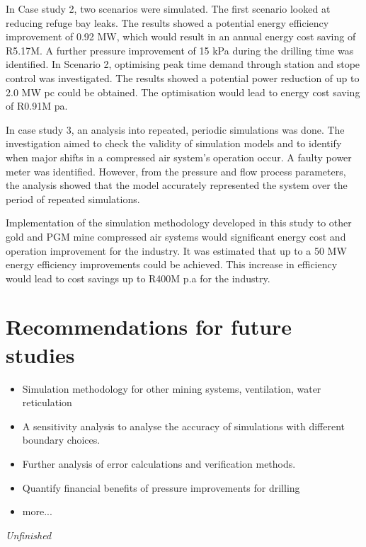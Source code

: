 	 \par
	 In Case study 2, two scenarios were simulated. The first scenario looked at reducing refuge bay leaks. The results showed a potential energy efficiency improvement of 0.92 MW, which would result in an annual energy cost saving of R5.17M. A further pressure improvement of 15 kPa during the drilling time was identified. In Scenario 2, optimising peak time demand through station and stope control was investigated. The results showed a potential power reduction of up to 2.0 MW \gls{pc} could be obtained. The optimisation would lead to energy cost saving of R0.91M \gls{pa}.
	 \par 
	 In case study 3, an analysis into repeated, periodic simulations was done. The investigation aimed to check the validity of simulation models and to identify when major shifts in a compressed air system’s operation occur. A faulty power meter was identified. However, from the pressure and flow process parameters, the analysis showed that the model accurately represented the system over the period of repeated simulations.
	 \par
	 Implementation of the simulation methodology developed in this study to other gold and PGM mine compressed air systems would significant energy cost and operation improvement for the industry. It was estimated that up to a 50 MW energy efficiency improvements could be achieved. This increase in efficiency would lead to cost savings up to R400M p.a for the industry. 
	 \section{Recommendations for future studies}
	 \begin{itemize}
	 	\item Simulation methodology for other mining systems, ventilation, water reticulation 
	 	\item A sensitivity analysis to analyse the accuracy of simulations with different boundary choices.
	 	\item Further analysis of error calculations and verification methods.
	 	\item Quantify financial benefits of pressure improvements for drilling
	 	\item more...
	 	
	 \end{itemize}
	 \textit{Unfinished}
	 